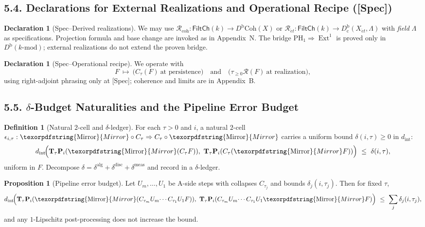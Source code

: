\documentclass[11pt]{article}
\numberwithin{equation}{section}
\theoremstyle{plain}
\theoremstyle{definition}
\theoremstyle{remark}
\DeclareMathOperator{\Ext}{Ext}
\theoremstyle{plain}
\theoremstyle{definition}
\numberwithin{equation}{section}
\newtheorem{proposition}[theorem]{Proposition}
\theoremstyle{definition}
\newtheorem{definition}[theorem]{Definition}
\newtheorem{declaration}[theorem]{Declaration}
\DeclareRobustCommand{\Mirror}{\texorpdfstring{\ensuremath{\operatorname{Mirror}}}{Mirror}}
\numberwithin{equation}{section}
\theoremstyle{plain}
\theoremstyle{definition}
\theoremstyle{remark}
\begin{document}
\subsection*{5.4. Declarations for External Realizations and Operational Recipe (\textbf{[Spec]})}

\begin{declaration}[Spec–Derived realizations]\label{spec:derived-geo}
We may use $\mathcal{R}_{\mathrm{coh}}:\mathsf{FiltCh}(k)\to D^{\mathrm{b}}\mathrm{Coh}(X)$ or
$\mathcal{R}_{\acute{e}t}:\mathsf{FiltCh}(k)\to D^{\mathrm{b}}_{\mathrm{c}}(X_{\acute{e}t},\Lambda)$ with \emph{field} $\Lambda$ as specifications.
Projection formula and base change are invoked as in Appendix~N. The bridge $\mathrm{PH}_1\Rightarrow\Ext^1$ is proved only in $D^{\mathrm{b}}(k\text{-mod})$; external realizations do not extend the proven bridge.
\end{declaration}

\begin{declaration}[Spec–Operational recipe]\label{spec:operational-coreflection}
We operate with
\[
F\ \longmapsto\ \big(C_\tau(F)\ \text{at persistence}\big)\quad\text{and}\quad\big(\tau_{\ge 0}\mathcal{R}(F)\ \text{at realization}\big),
\]
using right-adjoint phrasing only at [Spec]; coherence and limits are in Appendix~B.
\end{declaration}

\subsection*{5.5. $\delta$-Budget Naturalities and the Pipeline Error Budget}

\begin{definition}[Natural $2$-cell and $\delta$-ledger]\label{def:delta-2cell}
For each $\tau>0$ and $i$, a natural $2$-cell $\epsilon_{i,\tau}:\Mirror\circ C_\tau\Rightarrow C_\tau\circ\Mirror$ carries a uniform bound $\delta(i,\tau)\ge 0$ in $d_{\mathrm{int}}$:
\[
d_{\mathrm{int}}\!\Big(\mathbf{T}_\tau \mathbf{P}_i(\Mirror(C_\tau F)),\ \mathbf{T}_\tau \mathbf{P}_i(C_\tau(\Mirror F))\Big)\ \le\ \delta(i,\tau),
\]
uniform in $F$. Decompose $\delta=\delta^{\mathrm{alg}}+\delta^{\mathrm{disc}}+\delta^{\mathrm{meas}}$ and record in a $\delta$-ledger.
\end{definition}

\begin{proposition}[Pipeline error budget]\label{prop:pipeline-budget}
Let $U_m,\dots,U_1$ be A-side steps with collapses $C_{\tau_j}$ and bounds $\delta_j(i,\tau_j)$. Then for fixed $\tau$,
\[
d_{\mathrm{int}}\!\Big(\mathbf{T}_\tau \mathbf{P}_i(\Mirror(C_{\tau_m}U_m\!\cdots C_{\tau_1}U_1F)),\ \mathbf{T}_\tau \mathbf{P}_i(C_{\tau_m}U_m\!\cdots C_{\tau_1}U_1\Mirror F)\Big)\ \le\ \sum_{j} \delta_j(i,\tau_j),
\]
and any $1$-Lipschitz post-processing does not increase the bound.
\end{proposition}
\end{document}
